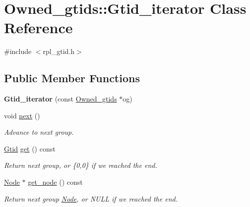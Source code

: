 \hypertarget{classOwned__gtids_1_1Gtid__iterator}{}\section{Owned\+\_\+gtids\+:\+:Gtid\+\_\+iterator Class Reference}
\label{classOwned__gtids_1_1Gtid__iterator}


{\ttfamily \#include $<$rpl\+\_\+gtid.\+h$>$}

\subsection*{Public Member Functions}
\begin{DoxyCompactItemize}
\item 
\mbox{\label{classOwned__gtids_1_1Gtid__iterator_abbe0db84f5b5df4d9119a28c1500b874}} 
{\bfseries Gtid\+\_\+iterator} (const \mbox{\hyperlink{classOwned__gtids}{Owned\+\_\+gtids}} $\ast$og)
\item 
\mbox{\label{classOwned__gtids_1_1Gtid__iterator_aebabc5ebeef241e0ba3a1ba2d07e9ec3}} 
void \mbox{\hyperlink{classOwned__gtids_1_1Gtid__iterator_aebabc5ebeef241e0ba3a1ba2d07e9ec3}{next}} ()
\begin{DoxyCompactList}\small\item\em Advance to next group. \end{DoxyCompactList}\item 
\mbox{\label{classOwned__gtids_1_1Gtid__iterator_ad246a7b8852f0032a951f1ae978156b9}} 
\mbox{\hyperlink{structGtid}{Gtid}} \mbox{\hyperlink{classOwned__gtids_1_1Gtid__iterator_ad246a7b8852f0032a951f1ae978156b9}{get}} () const
\begin{DoxyCompactList}\small\item\em Return next group, or \{0,0\} if we reached the end. \end{DoxyCompactList}\item 
\mbox{\label{classOwned__gtids_1_1Gtid__iterator_aa8289345e82dd96edaff88f67d86000f}} 
\mbox{\hyperlink{classNode}{Node}} $\ast$ \mbox{\hyperlink{classOwned__gtids_1_1Gtid__iterator_aa8289345e82dd96edaff88f67d86000f}{get\+\_\+node}} () const
\begin{DoxyCompactList}\small\item\em Return next group \mbox{\hyperlink{classNode}{Node}}, or N\+U\+LL if we reached the end. \end{DoxyCompactList}\end{DoxyCompactItemize}


